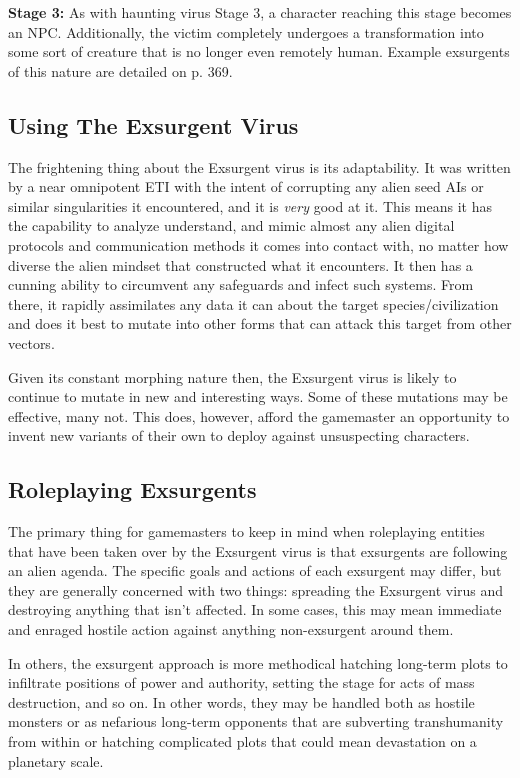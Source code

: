\textbf{Stage 3:} As with haunting virus Stage 3, a character reaching this stage becomes an NPC. Additionally, the victim completely undergoes a transformation into some sort of creature that is no longer even remotely human. Example exsurgents of this nature are detailed on p. 369. 

\subsection{Using The Exsurgent Virus} 

The frightening thing about the Exsurgent virus is its adaptability. It was written by a near omnipotent ETI with the intent of corrupting any alien seed AIs or similar singularities it encountered, and it is \textit{very} good at it. This means it has the capability to analyze understand, and mimic almost any alien digital protocols and communication methods it comes into contact with, no matter how diverse the alien mindset that constructed what it encounters. It then has a cunning ability to circumvent any safeguards and infect such systems. From there, it rapidly assimilates any data it can about the target species/civilization and does it best to mutate into other forms that can attack this target from other vectors. 

Given its constant morphing nature then, the Exsurgent virus is likely to continue to mutate in new and interesting ways. Some of these mutations may be effective, many not. This does, however, afford the gamemaster an opportunity to invent new variants of their own to deploy against unsuspecting characters. 

\subsection{Roleplaying Exsurgents} 

The primary thing for gamemasters to keep in mind when roleplaying entities that have been taken over by the Exsurgent virus is that exsurgents are following an alien agenda. The specific goals and actions of each exsurgent may differ, but they are generally concerned with two things: spreading the Exsurgent virus and destroying anything that isn't affected. In some cases, this may mean immediate and enraged hostile action against anything non-exsurgent around them. 

In others, the exsurgent approach is more methodical hatching long-term plots to infiltrate positions of power and authority, setting the stage for acts of mass destruction, and so on. In other words, they may be handled both as hostile monsters or as nefarious long-term opponents that are subverting transhumanity from within or hatching complicated plots that could mean devastation on a planetary scale. 

